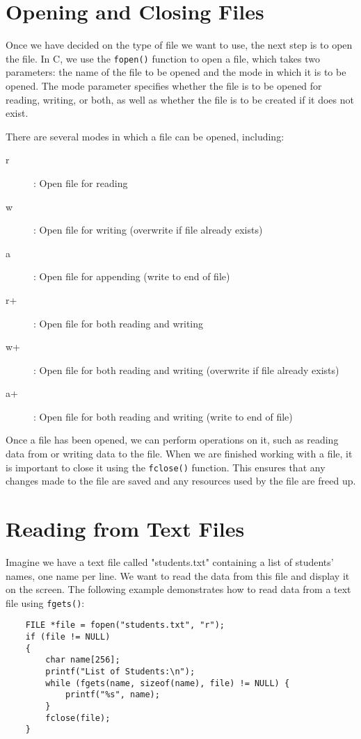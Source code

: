 \section{Opening and Closing Files}
Once we have decided on the type of file we want to use, the next step is to open the
file. In C, we use the {\tt fopen()} function to open a file, which takes two parameters:
the name of the file to be opened and the mode in which it is to be opened. The mode
parameter specifies whether the file is to be opened for reading, writing, or both, as
well as whether the file is to be created if it does not exist.

There are several modes in which a file can be opened, including:
\begin{description}
\item[r]: Open file for reading
\item[w]: Open file for writing (overwrite if file already exists)
\item[a]: Open file for appending (write to end of file)
\item[r+]: Open file for both reading and writing
\item[w+]: Open file for both reading and writing (overwrite if file already exists)
\item[a+]: Open file for both reading and writing (write to end of file)
\end{description}
Once a file has been opened, we can perform operations on it, such as reading data from
or writing data to the file. When we are finished working with a file, it is important to
close it using the {\tt fclose()} function. This ensures that any changes made to the
file are saved and any resources used by the file are freed up.


\section{Reading from Text Files}
Imagine we have a text file called "students.txt" containing a list of students' names, one name per line. We want to read the data from this file and display it on the screen. The following example demonstrates how to read data from a text file using {\tt fgets()}:

\begin{verbatim}
	FILE *file = fopen("students.txt", "r");
	if (file != NULL) 
	{
		char name[256];
		printf("List of Students:\n");
		while (fgets(name, sizeof(name), file) != NULL) {
			printf("%s", name);
		}
		fclose(file);
	}
\end{verbatim}

